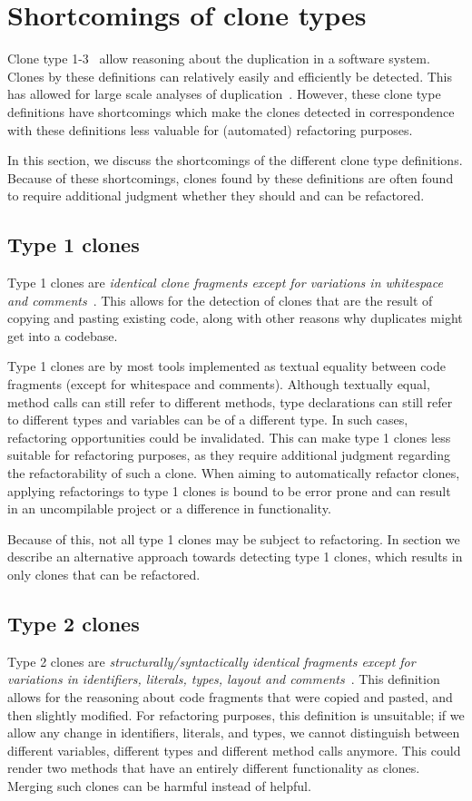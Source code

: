 \documentclass[a4paper]{article}
\begin{document}
\section{Shortcomings of clone types}
Clone type 1-3~\cite{roy2007survey} allow reasoning about the duplication in a software system. Clones by these definitions can relatively easily and efficiently be detected. This has allowed for large scale analyses of duplication~\cite{livieri2007very}. However, these clone type definitions have shortcomings which make the clones detected in correspondence with these definitions less valuable for (automated) refactoring purposes.

In this section, we discuss the shortcomings of the different clone type definitions. Because of these shortcomings, clones found by these definitions are often found to require additional judgment whether they should and can be refactored.

\subsection{Type 1 clones} \label{sec:type1}
Type 1 clones are \textit{identical clone fragments except for variations in whitespace and comments}~\cite{roy2007survey}. This allows for the detection of clones that are the result of copying and pasting existing code, along with other reasons why duplicates might get into a codebase.

Type 1 clones are by most tools implemented as textual equality between code fragments (except for whitespace and comments). Although textually equal, method calls can still refer to different methods, type declarations can still refer to different types and variables can be of a different type. In such cases, refactoring opportunities could be invalidated. This can make type 1 clones less suitable for refactoring purposes, as they require additional judgment regarding the refactorability of such a clone. When aiming to automatically refactor clones, applying refactorings to type 1 clones is bound to be error prone and can result in an uncompilable project or a difference in functionality.

Because of this, not all type 1 clones may be subject to refactoring. In section \label{chap:type1rclones} we describe an alternative approach towards detecting type 1 clones, which results in only clones that can be refactored.

\subsection{Type 2 clones}\label{sec:type2}
Type 2 clones are \textit{structurally/syntactically identical fragments except for variations in identifiers, literals, types, layout and comments}~\cite{roy2007survey}. This definition allows for the reasoning about code fragments that were copied and pasted, and then slightly modified. For refactoring purposes, this definition is unsuitable; if we allow any change in identifiers, literals, and types, we cannot distinguish between different variables, different types and different method calls anymore. This could render two methods that have an entirely different functionality as clones. Merging such clones can be harmful instead of helpful.
\end{document}
